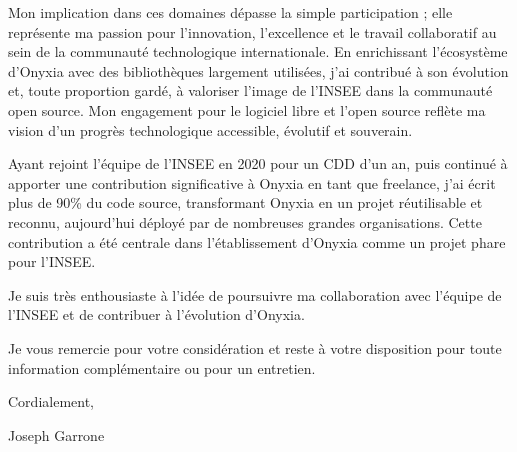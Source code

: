 \documentclass[10.5pt,a4paper]{article}
\begin{document}
Mon implication dans ces domaines dépasse la simple participation ; elle représente ma passion pour l'innovation, l'excellence et le travail collaboratif au sein de la communauté technologique internationale. En enrichissant l'écosystème d'Onyxia avec des bibliothèques largement utilisées, j'ai contribué à son évolution et, toute proportion gardé, à valoriser l'image de l'INSEE dans la communauté open source. Mon engagement pour le logiciel libre et l'open source reflète ma vision d'un progrès technologique accessible, évolutif et souverain.

\vspace{1em}

Ayant rejoint l'équipe de l'INSEE en 2020 pour un CDD d'un an, puis continué à apporter une contribution significative à Onyxia en tant que freelance, j'ai écrit plus de 90\% du code source, transformant Onyxia en un projet réutilisable et reconnu, aujourd'hui déployé par de nombreuses grandes organisations. Cette contribution a été centrale dans l'établissement d'Onyxia comme un projet phare pour l'INSEE.

\vspace{1em}

Je suis très enthousiaste à l'idée de poursuivre ma collaboration avec l'équipe de l'INSEE et de contribuer à l'évolution d'Onyxia.

\vspace{1em}

Je vous remercie pour votre considération et reste à votre disposition pour toute information complémentaire ou pour un entretien.

\vspace{2em}

Cordialement,

\vspace{1em}

Joseph Garrone
\end{document}
